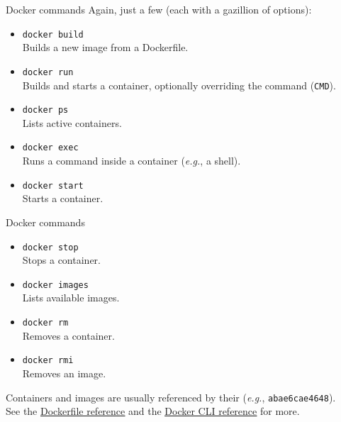\begin{frame}{Docker commands}
  \justifying
	Again, just a few (each with a gazillion of options):
	\begin{itemize}
		\item \texttt{docker build}\\Builds a new image from a Dockerfile.
		\item \texttt{docker run}\\Builds and starts a container, optionally overriding the command (\texttt{CMD}).
		\item \texttt{docker ps}\\Lists active containers.
		\item \texttt{docker exec}\\Runs a command inside a container (\emph{e.g.}, a shell).
		\item \texttt{docker start}\\Starts a container.
	\end{itemize}
\end{frame}
\begin{frame}{Docker commands}
  \justifying
	\begin{itemize}
		\item \texttt{docker stop}\\Stops a container.
		\item \texttt{docker images}\\Lists available images.
		\item \texttt{docker rm}\\Removes a container.
		\item \texttt{docker rmi}\\Removes an image.
	\end{itemize}
	Containers and images are usually referenced by their  (\emph{e.g.}, \texttt{abae6cae4648}).\\
	\bigskip
	See the \href{https://docs.docker.com/engine/reference/builder/}{\color{blue}\underline{Dockerfile reference}} and the \href{https://docs.docker.com/engine/reference/commandline/docker/}{\color{blue}\underline{Docker CLI reference}} for more.
\end{frame}

